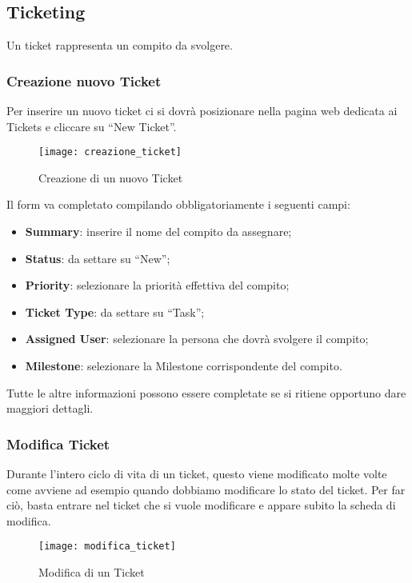 \subsection{Ticketing}
Un ticket rappresenta un compito da svolgere.

\subsubsection{Creazione nuovo Ticket}
\label{sec:creazione_ticket}
Per inserire un nuovo ticket ci si dovrà posizionare nella pagina web dedicata ai Tickets e cliccare su ``New Ticket''.
\begin{figure}[h]
\texttt{[image: creazione\_ticket]}
\caption{Creazione di un nuovo Ticket} \label{fig:creazione_ticket}
\end{figure}
Il form va completato compilando obbligatoriamente i seguenti campi:
\begin{itemize}
\item \textbf{Summary}: inserire il nome del compito da assegnare;
\item \textbf{Status}: da settare su ``New'';
\item \textbf{Priority}: selezionare la priorità effettiva del compito;
\item \textbf{Ticket Type}: da settare su ``Task'';
\item \textbf{Assigned User}: selezionare la persona che dovrà svolgere il compito;
\item \textbf{Milestone}: selezionare la Milestone corrispondente del compito.
\end{itemize}
Tutte le altre informazioni possono essere completate se si ritiene opportuno dare maggiori dettagli.

\subsubsection{Modifica Ticket}
Durante l'intero ciclo di vita di un ticket, questo viene modificato molte volte come avviene ad esempio quando dobbiamo modificare lo stato del ticket. Per far ciò, basta entrare nel ticket che si vuole modificare e appare subito la scheda di modifica.
\begin{figure}[h]
\texttt{[image: modifica\_ticket]}
\caption{Modifica di un Ticket} \label{fig:modifica_ticket}
\end{figure}

